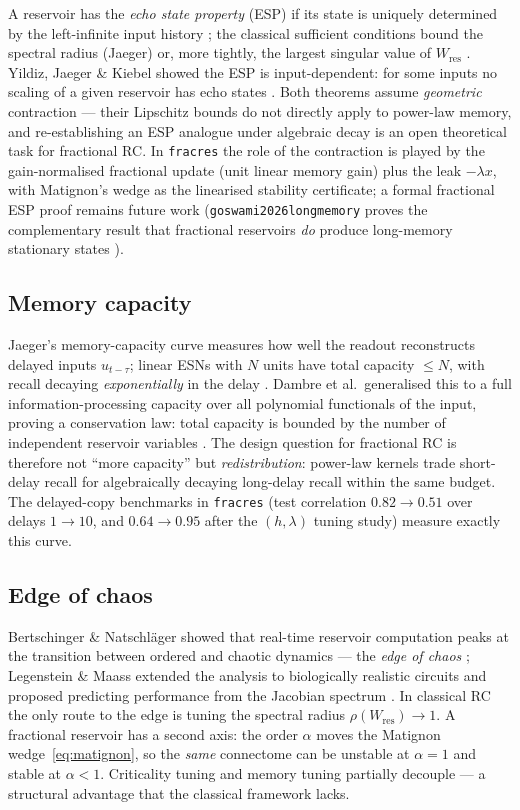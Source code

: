 \documentclass[11pt,a4paper]{article}
\begin{document}
A reservoir has the \emph{echo state property} (ESP) if its state is uniquely
determined by the left-infinite input history \cite{jaeger2001echo}; the
classical sufficient conditions bound the spectral radius (Jaeger) or, more
tightly, the largest singular value of $W_{\mathrm{res}}$
\cite{buehner2006tighter}. Yildiz, Jaeger \& Kiebel showed the ESP is
input-dependent: for some inputs no scaling of a given reservoir has echo
states \cite{yildiz2012echo}. Both theorems assume \emph{geometric}
contraction --- their Lipschitz bounds do not directly apply to power-law
memory, and re-establishing an ESP analogue under algebraic decay is an open
theoretical task for fractional RC. In \texttt{fracres} the role of the
contraction is played by the gain-normalised fractional update (unit linear
memory gain) plus the leak $-\lambda x$, with Matignon's wedge as the
linearised stability certificate; a formal fractional ESP proof remains
future work (\texttt{goswami2026longmemory} proves the complementary result
that fractional reservoirs \emph{do} produce long-memory stationary states
\cite{goswami2026longmemory}).

\subsection{Memory capacity}

Jaeger's memory-capacity curve measures how well the readout reconstructs
delayed inputs $u_{t-\tau}$; linear ESNs with $N$ units have total capacity
$\le N$, with recall decaying \emph{exponentially} in the delay
\cite{jaeger2002memory}. Dambre et al.\ generalised this to a full
information-processing capacity over all polynomial functionals of the input,
proving a conservation law: total capacity is bounded by the number of
independent reservoir variables \cite{dambre2012capacity}. The design
question for fractional RC is therefore not ``more capacity'' but
\emph{redistribution}: power-law kernels trade short-delay recall for
algebraically decaying long-delay recall within the same budget. The delayed-copy
benchmarks in \texttt{fracres} (test correlation $0.82 \to 0.51$ over delays
$1 \to 10$, and $0.64 \to 0.95$ after the $(h,\lambda)$ tuning study) measure
exactly this curve.

\subsection{Edge of chaos}

Bertschinger \& Natschl\"ager showed that real-time reservoir computation
peaks at the transition between ordered and chaotic dynamics --- the
\emph{edge of chaos} \cite{bertschinger2004edge}; Legenstein \& Maass extended
the analysis to biologically realistic circuits and proposed predicting
performance from the Jacobian spectrum \cite{legenstein2007edge}. In
classical RC the only route to the edge is tuning the spectral radius
$\rho(W_{\mathrm{res}}) \to 1$. A fractional reservoir has a second axis: the
order $\alpha$ moves the Matignon wedge~\eqref{eq:matignon}, so the
\emph{same} connectome can be unstable at $\alpha=1$ and stable at
$\alpha < 1$. Criticality tuning and memory tuning partially decouple --- a
structural advantage that the classical framework lacks.
\end{document}
